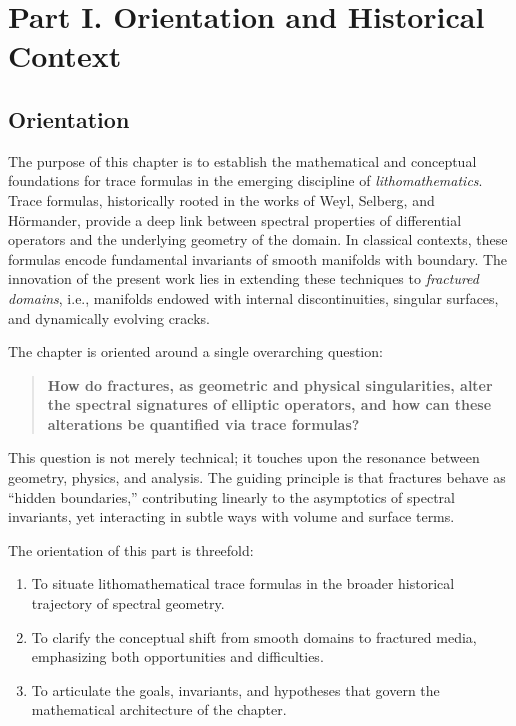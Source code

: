 \section*{Part I. Orientation and Historical Context}

\subsection*{Orientation}

The purpose of this chapter is to establish the mathematical and conceptual foundations for trace formulas in the emerging discipline of \emph{lithomathematics}. Trace formulas, historically rooted in the works of Weyl, Selberg, and Hörmander, provide a deep link between spectral properties of differential operators and the underlying geometry of the domain. In classical contexts, these formulas encode fundamental invariants of smooth manifolds with boundary. The innovation of the present work lies in extending these techniques to \emph{fractured domains}, i.e., manifolds endowed with internal discontinuities, singular surfaces, and dynamically evolving cracks. 

The chapter is oriented around a single overarching question:

\begin{quote}
\textbf{How do fractures, as geometric and physical singularities, alter the spectral signatures of elliptic operators, and how can these alterations be quantified via trace formulas?}
\end{quote}

This question is not merely technical; it touches upon the resonance between geometry, physics, and analysis. The guiding principle is that fractures behave as ``hidden boundaries,'' contributing linearly to the asymptotics of spectral invariants, yet interacting in subtle ways with volume and surface terms.

The orientation of this part is threefold:
\begin{enumerate}
    \item To situate lithomathematical trace formulas in the broader historical trajectory of spectral geometry.
    \item To clarify the conceptual shift from smooth domains to fractured media, emphasizing both opportunities and difficulties.
    \item To articulate the goals, invariants, and hypotheses that govern the mathematical architecture of the chapter.
\end{enumerate}


